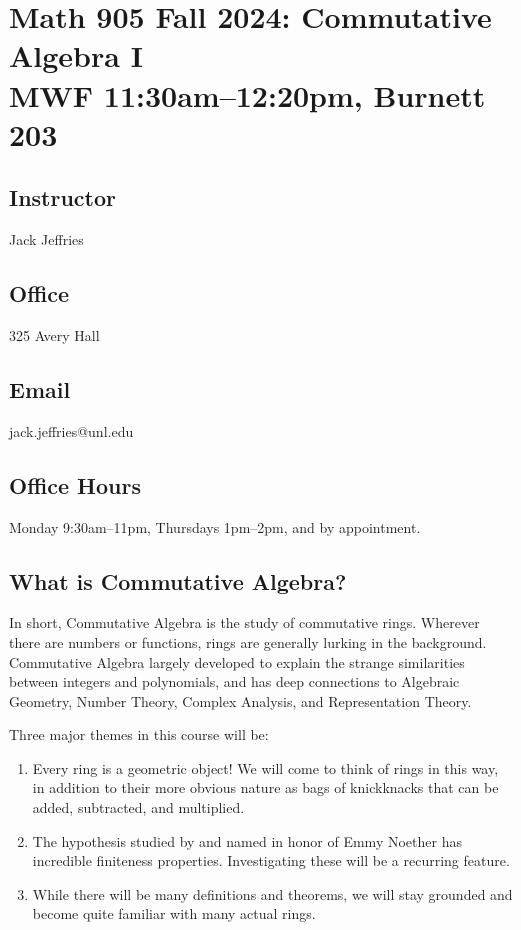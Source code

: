 \documentclass[12pt]{amsart}
\newcommand{\showsol}[1]{\def\displaysol{#1}}
\begin{document}
\showsol{0}
	
	\thispagestyle{empty}
	
	\section*{{\large Math 905 Fall 2024: Commutative Algebra I}\\ MWF 11:30am--12:20pm, Burnett 203}
	
	

	\subsection*{Instructor}  Jack Jeffries

	\subsection*{Office}  325 Avery Hall

	\subsection*{Email}   jack.jeffries@unl.edu

	\subsection*{Office Hours}  Monday 9:30am--11pm, Thursdays 1pm--2pm, and by appointment.

	
	\subsection*{What is Commutative Algebra?} In short, Commutative Algebra is the study of commutative rings. Wherever there are numbers or functions, rings are generally lurking in the background. Commutative Algebra largely developed to explain the strange similarities between integers and polynomials, and has deep connections to Algebraic Geometry, Number Theory, Complex Analysis, and Representation Theory.
	
	Three major themes in this course will be:
	\begin{enumerate}
	\item Every ring is a geometric object! We will come to think of rings in this way, in addition to their more obvious nature as bags of knickknacks that can be added, subtracted, and multiplied.
	\item The hypothesis studied by and named in honor of Emmy Noether has incredible finiteness properties. Investigating these will be a recurring feature.
	\item While there will be many definitions and theorems, we will stay grounded and become quite familiar with many actual rings.
	\end{enumerate}	
\end{document}
